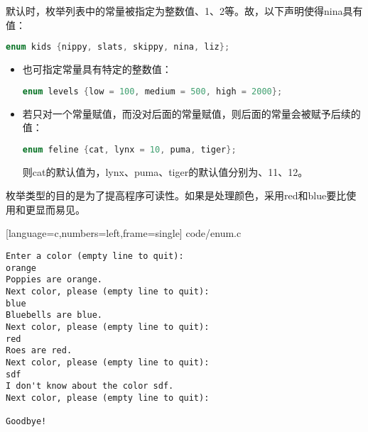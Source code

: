 \begin{frame}[fragile]\ft{\secname}
默认时，枚举列表中的常量被指定为整数值{、1、2}等。故，以下声明使得{\tf nina}具有值{}：
  \begin{lstlisting}[language=c,backgroundcolor=\color{red!20}]
enum kids {nippy, slats, skippy, nina, liz};
  \end{lstlisting}

\end{frame}

\begin{frame}[fragile]\ft{\secname}
  \begin{itemize}
  \item 
也可指定常量具有特定的整数值：
  \begin{lstlisting}[language=c,backgroundcolor=\color{red!20}]
enum levels {low = 100, medium = 500, high = 2000};
  \end{lstlisting}
\item 若只对一个常量赋值，而没对后面的常量赋值，则后面的常量会被赋予后续的值：
  \begin{lstlisting}[language=c,backgroundcolor=\color{red!20}]
enum feline {cat, lynx = 10, puma, tiger};
  \end{lstlisting}
则{\tf cat}的默认值为{}，{\tf lynx}、{\tf puma}、{\tf tiger}的默认值分别为{、11、12}。
  \end{itemize}
\end{frame}

\begin{frame}[fragile]
枚举类型的目的是为了提高程序可读性。如果是处理颜色，采用{\tf red}和{\tf blue}要比使用{}和{}更显而易见。
\end{frame}

\begin{frame}

[language=c,numbers=left,frame=single]
{code/enum.c}
\end{frame}


\begin{frame}
  \begin{lstlisting}[backgroundcolor=\color{blue!20}]
Enter a color (empty line to quit):
orange
Poppies are orange.
Next color, please (empty line to quit): 
blue
Bluebells are blue.
Next color, please (empty line to quit): 
red
Roes are red.
Next color, please (empty line to quit): 
sdf
I don't know about the color sdf.
Next color, please (empty line to quit): 

Goodbye!
\end{lstlisting}
\end{frame}

